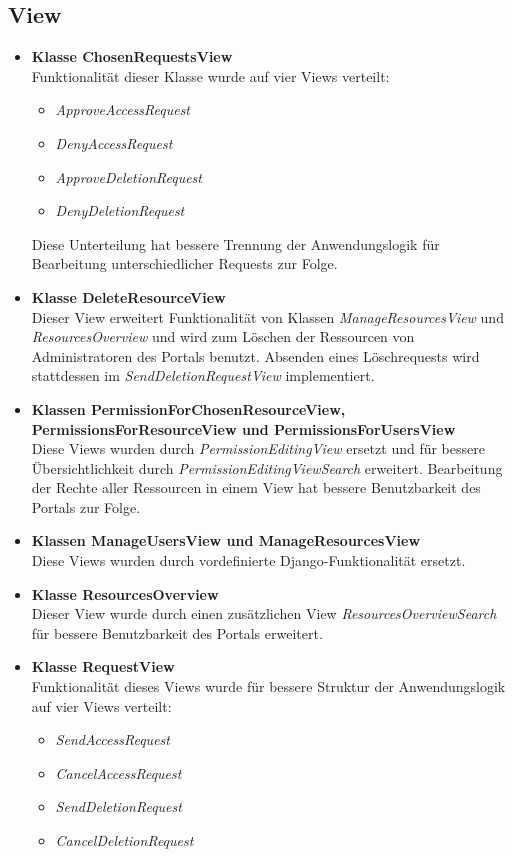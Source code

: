 \documentclass[parskip=full,11pt]{scrartcl}
\begin{document}
\newpage
\subsection{View} 
 
\begin{itemize}
\item \textbf{Klasse ChosenRequestsView}\\
Funktionalität dieser Klasse wurde auf vier Views verteilt:
\begin{itemize}
\item \textit{ApproveAccessRequest}
\item \textit{DenyAccessRequest}
\item \textit{ApproveDeletionRequest}
\item \textit{DenyDeletionRequest}
\end{itemize}
Diese Unterteilung hat bessere Trennung der Anwendungslogik für Bearbeitung unterschiedlicher Requests zur Folge. 

\item \textbf{Klasse DeleteResourceView}\\
Dieser View erweitert Funktionalität von Klassen \textit{ManageResourcesView} und \textit{ResourcesOverview} und wird zum Löschen der Ressourcen von Administratoren des Portals benutzt. Absenden eines Löschrequests wird stattdessen im \textit{SendDeletionRequestView} implementiert. 

\item \textbf{Klassen PermissionForChosenResourceView,  PermissionsForResourceView und PermissionsForUsersView}\\
Diese Views wurden durch \textit{PermissionEditingView} ersetzt und für bessere Übersichtlichkeit durch  \textit{PermissionEditingViewSearch} erweitert. Bearbeitung der Rechte aller Ressourcen in einem View hat bessere Benutzbarkeit des Portals zur Folge.

\item \textbf{Klassen ManageUsersView und ManageResourcesView}\\
Diese Views wurden durch vordefinierte Django-Funktionalität ersetzt.

\item \textbf{Klasse ResourcesOverview}\\
Dieser View wurde durch einen zusätzlichen View \textit{ResourcesOverviewSearch} für bessere Benutzbarkeit des Portals erweitert.

\item \textbf{Klasse RequestView}\\
Funktionalität dieses Views wurde für bessere Struktur der Anwendungslogik auf vier Views verteilt:
\begin{itemize}
\item \textit{SendAccessRequest}
\item \textit{CancelAccessRequest}
\item \textit{SendDeletionRequest}
\item \textit{CancelDeletionRequest}
\end{itemize}


\end{itemize}
\end{document}
